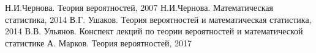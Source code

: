 \documentclass[oneside,final,14pt]{extreport}
\theoremstyle{plain}
\theoremstyle{definition}
\theoremstyle{named}
\begin{document}
\begin{thebibliography}{1}
		Н.И.Чернова.
		Теория вероятностей,
		2007
		Н.И.Чернова.
		Математическая статистика,
		2014
		В.Г. Ушаков.
		Теория вероятностей и математическая статистика,
		2014
		В.В. Ульянов.
		Конспект лекций по теории вероятностей и математической статистике
		А. Марков.
		Теория вероятностей,
		2017
\end{thebibliography}
\end{document}

